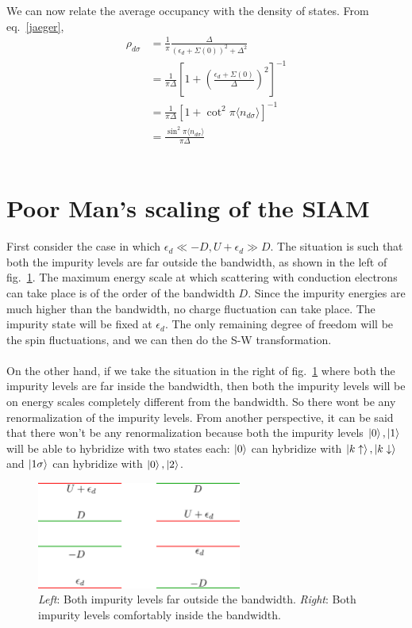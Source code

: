We can now relate the average occupancy with the density of states.
From eq.~\ref{jaeger},
\begin{equation}\begin{aligned}
	\rho_{d\sigma} &= \frac{1}{\pi}\frac{\Delta}{\left(\epsilon_d + \Sigma(0)\right)^2 + \Delta^2}\\
		       &= \frac{1}{\pi\Delta}\left[1+\left(\frac{\epsilon_d+\Sigma(0)}{\Delta}\right)^2\right]^{-1}\\
		       &=\frac{1}{\pi\Delta}\left[1+\cot^2\pi\langle  n_{d\sigma}\rangle\right]^{-1}\\
		       &=\frac{\sin^2 \pi\langle  n_{d\sigma}\rangle}{\pi \Delta}
\end{aligned}\end{equation}
\\

\section{Poor Man's scaling of the SIAM}
First consider the case in which \(\epsilon_d \ll -D, U+\epsilon_d \gg D\).
The situation is such that both the impurity levels are far outside the bandwidth, as shown in the left of fig.~\ref{and}.
The maximum energy scale at which scattering with conduction electrons can take place is of the order of the bandwidth \(D\).
Since the impurity energies are much higher than the bandwidth, no charge fluctuation can take place.
The impurity state will be fixed at \(\epsilon_d\).
The only remaining degree of freedom will be the spin fluctuations, and we can then do the S-W transformation.\\\\
On the other hand, if we take the situation in the right of fig.~\ref{and} where both the impurity levels are far inside the bandwidth, then both the impurity levels will be on energy scales completely different from the bandwidth.
So there wont be any renormalization of the impurity levels.
From another perspective, it can be said that there won't be any renormalization because both the impurity levels \(\ket{0},\ket{1}\) will be able to hybridize with two states each: \(\ket{0}\) can hybridize with \(\ket{k\uparrow},\ket{k\downarrow}\) and \(\ket{1\sigma}\) can hybridize with \(\ket{0},\ket{2}\).

\begin{figure}
    \centering
    \includegraphics[width=0.6\textwidth]{../figures/anderson.png}
    \caption{\textit{Left}: Both impurity levels far outside the bandwidth. \textit{Right}: Both impurity levels comfortably inside the bandwidth.}
    \label{and}
\end{figure}

